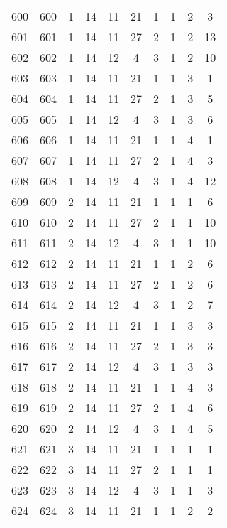 \begin{longtable}{cccccccccc}
  600 & 600 &   1 &  14 &  11 &  21 &   1 &   1 &   2 &   3 \\ 
  601 & 601 &   1 &  14 &  11 &  27 &   2 &   1 &   2 &  13 \\ 
  602 & 602 &   1 &  14 &  12 &   4 &   3 &   1 &   2 &  10 \\ 
  603 & 603 &   1 &  14 &  11 &  21 &   1 &   1 &   3 &   1 \\ 
  604 & 604 &   1 &  14 &  11 &  27 &   2 &   1 &   3 &   5 \\ 
  605 & 605 &   1 &  14 &  12 &   4 &   3 &   1 &   3 &   6 \\ 
  606 & 606 &   1 &  14 &  11 &  21 &   1 &   1 &   4 &   1 \\ 
  607 & 607 &   1 &  14 &  11 &  27 &   2 &   1 &   4 &   3 \\ 
  608 & 608 &   1 &  14 &  12 &   4 &   3 &   1 &   4 &  12 \\ 
  609 & 609 &   2 &  14 &  11 &  21 &   1 &   1 &   1 &   6 \\ 
  610 & 610 &   2 &  14 &  11 &  27 &   2 &   1 &   1 &  10 \\ 
  611 & 611 &   2 &  14 &  12 &   4 &   3 &   1 &   1 &  10 \\ 
  612 & 612 &   2 &  14 &  11 &  21 &   1 &   1 &   2 &   6 \\ 
  613 & 613 &   2 &  14 &  11 &  27 &   2 &   1 &   2 &   6 \\ 
  614 & 614 &   2 &  14 &  12 &   4 &   3 &   1 &   2 &   7 \\ 
  615 & 615 &   2 &  14 &  11 &  21 &   1 &   1 &   3 &   3 \\ 
  616 & 616 &   2 &  14 &  11 &  27 &   2 &   1 &   3 &   3 \\ 
  617 & 617 &   2 &  14 &  12 &   4 &   3 &   1 &   3 &   3 \\ 
  618 & 618 &   2 &  14 &  11 &  21 &   1 &   1 &   4 &   3 \\ 
  619 & 619 &   2 &  14 &  11 &  27 &   2 &   1 &   4 &   6 \\ 
  620 & 620 &   2 &  14 &  12 &   4 &   3 &   1 &   4 &   5 \\ 
  621 & 621 &   3 &  14 &  11 &  21 &   1 &   1 &   1 &   1 \\ 
  622 & 622 &   3 &  14 &  11 &  27 &   2 &   1 &   1 &   1 \\ 
  623 & 623 &   3 &  14 &  12 &   4 &   3 &   1 &   1 &   3 \\ 
  624 & 624 &   3 &  14 &  11 &  21 &   1 &   1 &   2 &   2 \\ 

\end{longtable}
